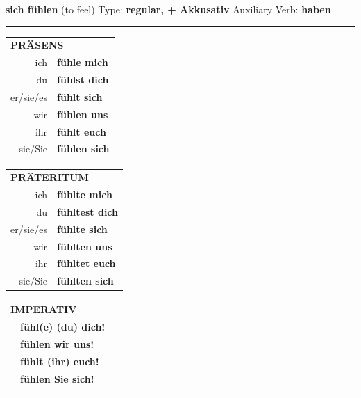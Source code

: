 \documentclass[10pt,a4paper]{revtex4-2}
\begin{document}
\begin{verbbox-acc}
        {\Large \bf sich fühlen} (to feel) \hfill Type: \textbf{regular, + Akkusativ} \hfill Auxiliary Verb: \textbf{haben} 
    
       \vspace{5pt}

    \hrule
    
    \vspace{5pt}

  \begin{tabular}{rl}
     \multicolumn{2}{l}{\textbf{PRÄSENS} }\\
    ich & \textbf{fühle mich}\\
    du & \textbf{fühlst dich}\\
    er/sie/es & \textbf{fühlt sich}\\
    wir & \textbf{fühlen uns}\\
    ihr & \textbf{fühlt euch}\\
    sie/Sie & \textbf{fühlen sich}\\
  \end{tabular}
  \hfill
     \begin{tabular}{rl}
    \multicolumn{2}{l}{\textbf{PRÄTERITUM} }\\
    ich & \textbf{fühlte mich}\\
    du & \textbf{fühltest dich}\\
    er/sie/es & \textbf{fühlte sich}\\
    wir & \textbf{fühlten uns}\\
    ihr & \textbf{fühltet euch}\\
    sie/Sie & \textbf{fühlten sich}\\
  \end{tabular}
  \hfill
  \begin{tabular}{rl}
     \multicolumn{2}{l}{\textbf{IMPERATIV} }\\
   & \textbf{fühl(e) (du) dich!}\\
   & \textbf{fühlen wir uns!}\\
   & \textbf{fühlt (ihr) euch!}\\
   & \textbf{fühlen Sie sich!}\\
   & \vspace{10pt}
  \end{tabular}

    \vspace{10pt}


\end{verbbox-acc}
\end{document}
